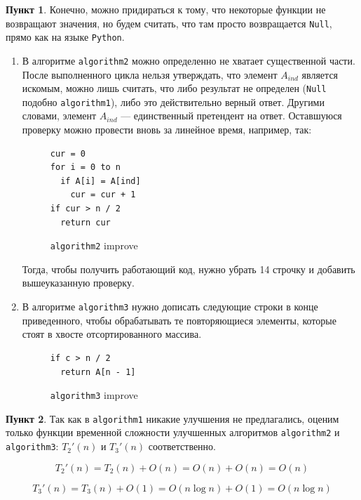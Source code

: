 \documentclass[11pt,a4paper]{scrarticle}
\theoremstyle{definition}
\newtheorem{subtask}{Пункт}
\begin{document}
\begin{subtask}
	Конечно, можно придираться к тому, что некоторые функции не возвращают значения, но будем считать, что там просто возвращается \texttt{Null}, прямо как на языке \texttt{Python}.

	\begin{enumerate}
		\item В алгоритме \texttt{algorithm2} можно определенно не хватает существенной части. После выполненного цикла нельзя утверждать, что элемент $A_{ind}$ является искомым, можно лишь считать, что либо результат не определен (\texttt{Null} подобно \texttt{algorithm1}), либо это действительно верный ответ. Другими словами, элемент $A_{ind}$ --- единственный претендент на ответ. Оставшуюся проверку можно провести вновь за линейное время, например, так:

		      \begin{figure}[h]
			      \centering
			      \begin{minipage}{0.4\textwidth}
				      \begin{verbatim}
cur = 0
for i = 0 to n
  if A[i] = A[ind]
	cur = cur + 1
if cur > n / 2
  return cur
					  \end{verbatim}

			      \end{minipage}
			      \caption{\texttt{algorithm2} improve}
		      \end{figure}

		      Тогда, чтобы получить работающий код, нужно убрать 14 строчку и добавить вышеуказанную проверку.
		\item В алгоритме \texttt{algorithm3} нужно дописать следующие строки в конце приведенного, чтобы обрабатывать те повторяющиеся элементы, которые стоят в хвосте отсортированного массива.

		      \begin{figure}[h]
			      \centering
			      \begin{minipage}{0.4\textwidth}
				      \begin{verbatim}
if c > n / 2
  return A[n - 1]
					  \end{verbatim}

			      \end{minipage}
			      \caption{\texttt{algorithm3} improve}
		      \end{figure}

	\end{enumerate}
\end{subtask}

\begin{subtask}
	Так как в \texttt{algorithm1} никакие улучшения не предлагались, оценим только функции временной сложности улучшенных алгоритмов \texttt{algorithm2} и \texttt{algorithm3}: $T_2'(n)$ и $T_3'(n)$ соответственно.

	$$
		T_2'(n) = T_2(n) + O(n) = O(n) + O(n) = O(n)
	$$

	$$
		T_3'(n) = T_3(n) + O(1) = O(n \log n) + O(1) = O(n \log n)
	$$
\end{subtask}
\end{document}
